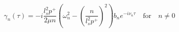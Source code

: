 \begin{equation}
\gamma_{n}(\tau) = - i \frac{l_s^2 p^+}{2 \mu n} 
          \left( \omega_n^2 - \left( \frac{n}{l_s^2 p^+} \right)^2 \right)
          b_n e^{-i \nu_n \tau} \quad \textrm{for} \quad n \neq 0
\end{equation}

